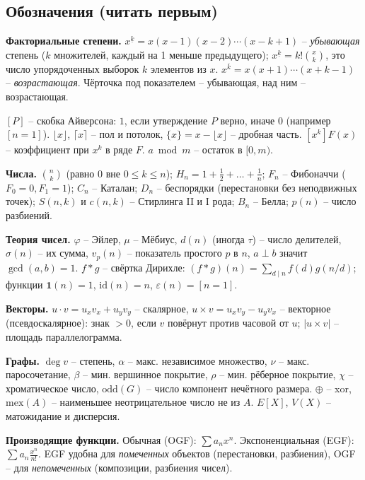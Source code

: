 \subsection{Обозначения (читать первым)}
\textbf{Факториальные степени.} $x^{\underline k}=x(x-1)(x-2)\cdots(x-k+1)$ -- \emph{убывающая} степень ($k$ множителей, каждый на 1 меньше предыдущего); $x^{\underline k}=k!\binom xk$, это число упорядоченных выборок $k$ элементов из $x$. $x^{\overline k}=x(x+1)\cdots(x+k-1)$ -- \emph{возрастающая}. Чёрточка под показателем -- убывающая, над ним -- возрастающая.
\par $[P]$ -- скобка Айверсона: $1$, если утверждение $P$ верно, иначе $0$ (например $[n=1]$). $\lfloor x\rfloor$, $\lceil x\rceil$ -- пол и потолок, $\{x\}=x-\lfloor x\rfloor$ -- дробная часть. $[x^k]F(x)$ -- коэффициент при $x^k$ в ряде $F$. $a\bmod m$ -- остаток в $[0,m)$.
\par \textbf{Числа.} $\binom nk$ (равно 0 вне $0\le k\le n$); $H_n=1+\frac12+\dots+\frac1n$; $F_n$ -- Фибоначчи ($F_0{=}0,F_1{=}1$); $C_n$ -- Каталан; $D_n$ -- беспорядки (перестановки без неподвижных точек); $S(n,k)$ и $c(n,k)$ -- Стирлинга II и I рода; $B_n$ -- Белла; $p(n)$ -- число разбиений.
\par \textbf{Теория чисел.} $\varphi$ -- Эйлер, $\mu$ -- Мёбиус, $d(n)$ (иногда $\tau$) -- число делителей, $\sigma(n)$ -- их сумма, $v_p(n)$ -- показатель простого $p$ в $n$, $a\perp b$ значит $\gcd(a,b)=1$. $f*g$ -- свёртка Дирихле: $(f*g)(n)=\sum_{d\mid n}f(d)g(n/d)$; функции $\mathbf1(n)=1$, $\mathrm{id}(n)=n$, $\varepsilon(n)=[n=1]$.
\par \textbf{Векторы.} $u\cdot v=u_xv_x+u_yv_y$ -- скалярное, $u\times v=u_xv_y-u_yv_x$ -- векторное (псевдоскалярное): знак $>0$, если $v$ повёрнут против часовой от $u$; $|u\times v|$ -- площадь параллелограмма.
\par \textbf{Графы.} $\deg v$ -- степень, $\alpha$ -- макс. независимое множество, $\nu$ -- макс. паросочетание, $\beta$ -- мин. вершинное покрытие, $\rho$ -- мин. рёберное покрытие, $\chi$ -- хроматическое число, $\mathrm{odd}(G)$ -- число компонент нечётного размера. $\oplus$ -- xor, $\mathrm{mex}(A)$ -- наименьшее неотрицательное число не из $A$. $E[X]$, $V(X)$ -- матожидание и дисперсия.
\par \textbf{Производящие функции.} Обычная (OGF): $\sum a_nx^n$. Экспоненциальная (EGF): $\sum a_n\frac{x^n}{n!}$. EGF удобна для \emph{помеченных} объектов (перестановки, разбиения), OGF -- для \emph{непомеченных} (композиции, разбиения чисел).
